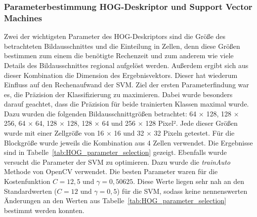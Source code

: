 \subsubsection{Parameterbestimmung HOG-Deskriptor und Support Vector Machines} \label{sssec:HOG:parmeter}
Zwei der wichtigsten Parameter des HOG-Deskriptors sind die Größe des betrachteten Bildausschnittes und die Einteilung in Zellen, denn diese Größen bestimmen zum einem die benötigte Rechenzeit und zum anderem wie viele Details des Bildausschnittes regional aufgelöst werden. Außerdem ergibt sich aus dieser Kombination die Dimension des Ergebnisvektors. Dieser hat wiederum Einfluss auf den Rechenaufwand der SVM. Ziel der ersten Parameterfindung war es, die Präzision der Klassifizierung zu maximieren. Dabei wurde besonders darauf geachtet, dass die Präzision für beide trainierten Klassen maximal wurde. Dazu wurden die folgenden Bildausschnittgrößen betrachtet: 64 $\times$ 128, 128  $\times$ 256, 64 $\times$ 64, 128 $\times$ 128, 128 $\times$ 64 und 256 $\times$ 128 Pixel². Jede dieser Größen wurde mit einer Zellgröße von 16 $\times$ 16 und 32 $\times$ 32 Pixeln getestet. Für die Blockgröße wurde jeweils die Kombination aus 4 Zellen verwendet. Die Ergebnisse sind in Tabelle~\ref{tab:HOG_parameter_selection} gezeigt.  
Ebenfalls wurde versucht die Parameter der SVM zu optimieren. Dazu wurde die \textit{trainAuto} Methode von OpenCV verwendet. Die besten Parameter waren für die Kostenfunktion $C=12,5$ und $\gamma=0,50625$. Diese Werte liegen sehr nah an den Standardwerten ($C=12$ und $\gamma=0,5$) für die SVM, sodass keine nennenswerten Änderungen an den Werten aus Tabelle~\ref{tab:HOG_parameter_selection} bestimmt werden konnten.


